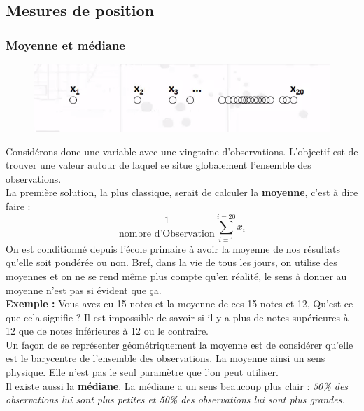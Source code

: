 \subsection{Mesures de position}
\subsubsection{Moyenne et médiane}

\begin{figure}[H]\begin{center}\includegraphics[scale=0.5]{ilu/g4.png}\end{center}\end{figure}
Considérons donc une variable avec une vingtaine d'observations. L'objectif est de trouver une valeur autour de laquel se situe globalement l'ensemble des observations. \newline
\\ La première solution, la plus classique, serait de calculer la \textbf{moyenne}, c'est à dire faire : 
$$\frac{1}{\textrm{nombre d'Observation}}\sum_{i=1}^{i=20} x_{i}$$
On est conditionné depuis l'école primaire à avoir la moyenne de nos résultats qu'elle soit pondérée ou non.  Bref, dans la vie de tous les jours, on utilise des moyennes et on ne se rend même plus compte qu'en réalité, le \underline{sens à donner au moyenne n'est pas si évident que ça}.\newline 
\\
\textbf{Exemple :} Vous avez eu 15 notes et la moyenne de ces 15 notes et 12, Qu'est ce que cela signifie ?\newline
Il est impossible de savoir si il y a plus de notes supérieures à 12 que de notes inférieures à 12 ou le contraire.\newline
\\
Un façon de se représenter géométriquement la moyenne est de considérer qu'elle est le barycentre de l'ensemble des observations. La moyenne ainsi un sens physique. \newline
Elle n'est pas le seul paramètre que l'on peut utiliser.\newline
\\
Il existe aussi la \textbf{médiane}. La médiane a un sens beaucoup plus clair : \textit{50\% des observations lui sont plus petites et 50\% des observations lui sont plus grandes.}\newline
